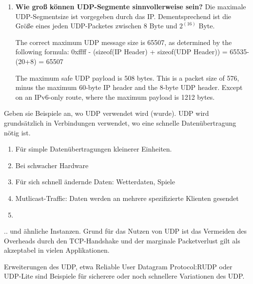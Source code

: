 \documentclass[11pt]{article}
\begin{document}
\begin{enumerate}[label=\textbf{\alph*}.)]
        \item \textbf{Wie groß können UDP-Segmente sinnvollerweise sein?}
        Die maximale UDP-Segmentsize ist vorgegeben durch das IP. Dementsprechend ist die Größe eines
        jeden UDP-Packetes zwischen 8 Byte und $2^(16)$ Byte.

        The correct maximum UDP message size is 65507, as determined by the following formula:
        0xffff - (sizeof(IP Header) + sizeof(UDP Header)) = 65535-(20+8) = 65507

        The maximum safe UDP payload is 508 bytes.
        This is a packet size of 576, minus the maximum 60-byte IP header and the 8-byte UDP header.
        Except on an IPv6-only route, where the maximum payload is 1212 bytes.

    \end{enumerate}

    Geben sie Beispiele an, wo UDP verwendet wird (wurde).
    UDP wird grundsätzlich in Verbindungen verwendet, wo eine schnelle Datenübertragung nötig ist.
    \begin{enumerate}[$\bullet$]
        \item Für simple Datenübertragungen kleinerer Einheiten.
        \item Bei schwacher Hardware
        \item Für sich schnell ändernde Daten: Wetterdaten, Spiele
        \item Mutlicast-Traffic: Daten werden an mehrere spezifizierte Klienten gesendet
        \item
    \end{enumerate}
    .. und ähnliche Instanzen.
    Grund für das Nutzen von UDP ist das Vermeiden des Overheads durch den TCP-Handshake und der marginale
    Packetverlust gilt als akzeptabel in vielen Applikationen.

    Erweiterungen des UDP, etwa Reliable User Datagram Protocol:RUDP oder UDP-Lite sind Beispiele für
    sicherere oder noch schnellere Variationen des UDP.
\end{document}
